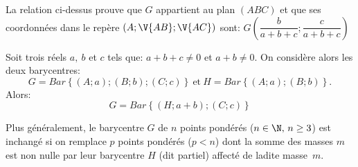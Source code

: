 \documentclass[a4paper]{article}
\begin{document}
La relation ci-dessus prouve que $G$ appartient au plan $(ABC)$ et que
ses coordonn\'ees dans le rep\`ere $(A;\V{AB};\V{AC})$ sont: $G(\dfrac{b}{a+b+c};\dfrac{c}{a+b+c})$

\begin{prop}
Soit trois r\'eels $a,\ b$ et $c$ tels que: $a+b+c\neq0$ et $a+b\neq0$. On consid\`ere alors les deux barycentres:
  \[ G=Bar\left\{(A;a);(B;b);(C;c)\right\} \ \text{et} \ H=Bar\left\{(A;a);(B;b)\right\}. \]
Alors: \[ G=Bar\left\{(H;a+b);(C;c)\right\} \]
\end{prop}

Plus g\'en\'eralement, le barycentre $G$ de $n$ points pond\'er\'es
($n\in\N,\, n\geq 3$) est inchang\'e si on remplace $p$ points
pond\'er\'es ($p<n$) dont la somme des masses $m$ est non nulle par leur
barycentre $H$ (dit partiel) affect\'e de ladite masse~$m$.



\end{document}
